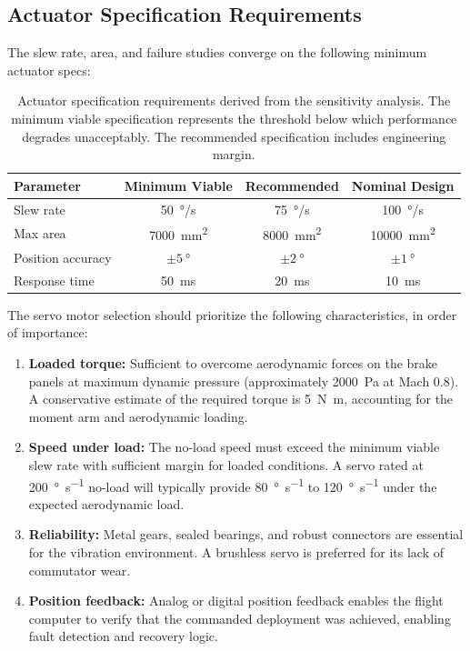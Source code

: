 \documentclass[11pt,letterpaper]{article}
\begin{document}
\subsection{Actuator Specification Requirements}
\label{sec:actuator_specs}

The slew rate, area, and failure studies converge on the following minimum actuator specs:

\begin{table}[H]
    \centering
    \caption{Actuator specification requirements derived from the sensitivity analysis. The minimum viable specification represents the threshold below which performance degrades unacceptably. The recommended specification includes engineering margin.}
    \label{tab:actuator_specs}
    \begin{tabular}{lccc}
        \toprule
        \textbf{Parameter} & \textbf{Minimum Viable} & \textbf{Recommended} & \textbf{Nominal Design} \\
        \midrule
        Slew rate & \SI{50}{\degree/\second} & \SI{75}{\degree/\second} & \SI{100}{\degree/\second} \\
        Max area & \SI{7000}{\milli\metre\squared} & \SI{8000}{\milli\metre\squared} & \SI{10000}{\milli\metre\squared} \\
        Position accuracy & $\pm\SI{5}{\degree}$ & $\pm\SI{2}{\degree}$ & $\pm\SI{1}{\degree}$ \\
        Response time & \SI{50}{\milli\second} & \SI{20}{\milli\second} & \SI{10}{\milli\second} \\
        \bottomrule
    \end{tabular}
\end{table}

The servo motor selection should prioritize the following characteristics, in order of importance:
\begin{enumerate}[nosep]
    \item \textbf{Loaded torque:} Sufficient to overcome aerodynamic forces on the brake panels at maximum dynamic pressure (approximately \SI{2000}{\pascal} at Mach 0.8). A conservative estimate of the required torque is \SI{5}{\newton\metre}, accounting for the moment arm and aerodynamic loading.
    \item \textbf{Speed under load:} The no-load speed must exceed the minimum viable slew rate with sufficient margin for loaded conditions. A servo rated at \SI{200}{\degree\per\second} no-load will typically provide \SI{80}{\degree\per\second} to \SI{120}{\degree\per\second} under the expected aerodynamic load.
    \item \textbf{Reliability:} Metal gears, sealed bearings, and robust connectors are essential for the vibration environment. A brushless servo is preferred for its lack of commutator wear.
    \item \textbf{Position feedback:} Analog or digital position feedback enables the flight computer to verify that the commanded deployment was achieved, enabling fault detection and recovery logic.
\end{enumerate}
\end{document}
